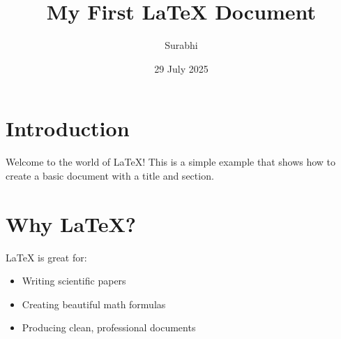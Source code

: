 \documentclass{article}
\title{My First LaTeX Document}
\author{Surabhi}
\date{29 July 2025}
\begin{document}
\maketitle

\section{Introduction}
Welcome to the world of \LaTeX! This is a simple example that shows how to create a basic document with a title and section.

\section{Why LaTeX?}
LaTeX is great for:
\begin{itemize}
  \item Writing scientific papers
  \item Creating beautiful math formulas
  \item Producing clean, professional documents
\end{itemize}
\end{document}
